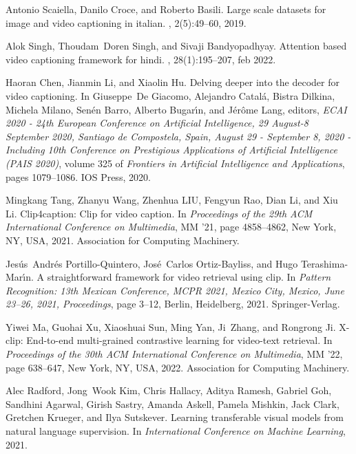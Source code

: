 \documentclass{article}
\begin{document}
\begin{thebibliography}{10}
Antonio Scaiella, Danilo Croce, and Roberto Basili.
\newblock Large scale datasets for image and video captioning in italian.
, 2(5):49--60,
  2019.

Alok Singh, Thoudam~Doren Singh, and Sivaji Bandyopadhyay.
\newblock Attention based video captioning framework for hindi.
, 28(1):195–207, feb 2022.

Haoran Chen, Jianmin Li, and Xiaolin Hu.
\newblock Delving deeper into the decoder for video captioning.
\newblock In Giuseppe~De Giacomo, Alejandro Catal{\'{a}}, Bistra Dilkina,
  Michela Milano, Sen{\'{e}}n Barro, Alberto Bugar{\'{\i}}n, and
  J{\'{e}}r{\^{o}}me Lang, editors, {\em {ECAI} 2020 - 24th European Conference
  on Artificial Intelligence, 29 August-8 September 2020, Santiago de
  Compostela, Spain, August 29 - September 8, 2020 - Including 10th Conference
  on Prestigious Applications of Artificial Intelligence {(PAIS} 2020)}, volume
  325 of {\em Frontiers in Artificial Intelligence and Applications}, pages
  1079--1086. {IOS} Press, 2020.

Mingkang Tang, Zhanyu Wang, Zhenhua LIU, Fengyun Rao, Dian Li, and Xiu Li.
\newblock Clip4caption: Clip for video caption.
\newblock In {\em Proceedings of the 29th ACM International Conference on
  Multimedia}, MM '21, page 4858–4862, New York, NY, USA, 2021. Association
  for Computing Machinery.

Jes\'{u}s~Andr\'{e}s Portillo-Quintero, Jos\'{e}~Carlos Ortiz-Bayliss, and Hugo
  Terashima-Mar\'{\i}n.
\newblock A straightforward framework for video retrieval using clip.
\newblock In {\em Pattern Recognition: 13th Mexican Conference, MCPR 2021,
  Mexico City, Mexico, June 23–26, 2021, Proceedings}, page 3–12, Berlin,
  Heidelberg, 2021. Springer-Verlag.

Yiwei Ma, Guohai Xu, Xiaoshuai Sun, Ming Yan, Ji~Zhang, and Rongrong Ji.
\newblock X-clip: End-to-end multi-grained contrastive learning for video-text
  retrieval.
\newblock In {\em Proceedings of the 30th ACM International Conference on
  Multimedia}, MM '22, page 638–647, New York, NY, USA, 2022. Association for
  Computing Machinery.

Alec Radford, Jong~Wook Kim, Chris Hallacy, Aditya Ramesh, Gabriel Goh,
  Sandhini Agarwal, Girish Sastry, Amanda Askell, Pamela Mishkin, Jack Clark,
  Gretchen Krueger, and Ilya Sutskever.
\newblock Learning transferable visual models from natural language
  supervision.
\newblock In {\em International Conference on Machine Learning}, 2021.


\end{thebibliography}
\end{document}
